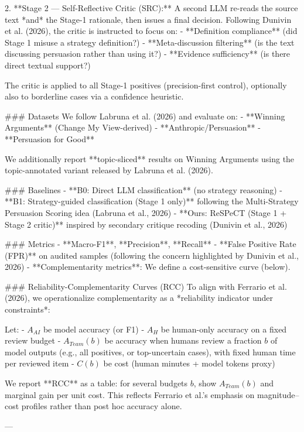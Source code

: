 2. **Stage 2 — Self-Reflective Critic (SRC):**  
   A second LLM re-reads the source text *and* the Stage-1 rationale, then issues a final decision. Following Dunivin et al. (2026), the critic is instructed to focus on:  
   - **Definition compliance** (did Stage 1 misuse a strategy definition?)  
   - **Meta-discussion filtering** (is the text discussing persuasion rather than using it?)  
   - **Evidence sufficiency** (is there direct textual support?)  

The critic is applied to all Stage-1 positives (precision-first control), optionally also to borderline cases via a confidence heuristic.

### Datasets  
We follow Labruna et al. (2026) and evaluate on:  
- **Winning Arguments** (Change My View-derived)  
- **Anthropic/Persuasion**  
- **Persuasion for Good**

We additionally report **topic-sliced** results on Winning Arguments using the topic-annotated variant released by Labruna et al. (2026).

### Baselines  
- **B0: Direct LLM classification** (no strategy reasoning)  
- **B1: Strategy-guided classification (Stage 1 only)** following the Multi-Strategy Persuasion Scoring idea (Labruna et al., 2026)  
- **Ours: ReSPeCT (Stage 1 + Stage 2 critic)** inspired by secondary critique recoding (Dunivin et al., 2026)

### Metrics  
- **Macro-F1**, **Precision**, **Recall**  
- **False Positive Rate (FPR)** on audited samples (following the concern highlighted by Dunivin et al., 2026)  
- **Complementarity metrics**: We define a cost-sensitive curve (below).

### Reliability-Complementarity Curves (RCC)  
To align with Ferrario et al. (2026), we operationalize complementarity as a *reliability indicator under constraints*:

Let:  
- \(A_{AI}\) be model accuracy (or F1)  
- \(A_{H}\) be human-only accuracy on a fixed review budget  
- \(A_{Team}(b)\) be accuracy when humans review a fraction \(b\) of model outputs (e.g., all positives, or top-uncertain cases), with fixed human time per reviewed item  
- \(C(b)\) be cost (human minutes + model tokens proxy)

We report **RCC** as a table: for several budgets \(b\), show \(A_{Team}(b)\) and marginal gain per unit cost. This reflects Ferrario et al.’s emphasis on magnitude–cost profiles rather than post hoc accuracy alone.

---

